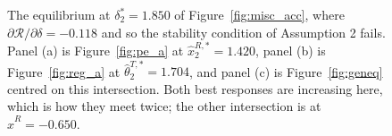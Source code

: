 \begin{figure}[htbp]
\begin{subfigure}[t]{0.32\textwidth}
\label{fig:tri2_c}
\end{subfigure}
\caption{The equilibrium at $\delta^*_{2}=1.850$ of Figure~\ref{fig:misc_acc}, where $\partial\mathcal{R}/\partial\delta=-0.118$ and so the stability condition of Assumption 2 fails. Panel (a) is Figure~\ref{fig:pe_a} at $\hat{x}^{R,*}_{2}=1.420$, panel (b) is Figure~\ref{fig:reg_a} at $\hat{\theta}^{T,*}_{2}=1.704$, and panel (c) is Figure~\ref{fig:geneq} centred on this intersection. Both best responses are increasing here, which is how they meet twice; the other intersection is at $\hat{x}^R=-0.650$.}
\label{fig:tri2}
\end{figure}
